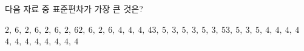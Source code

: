 다음 자료 중 표준편차가 가장 큰 것은?
\begin{choicesv}{$2,\ 6,\ 2,\ 6,\ 2,\ 6,\ 2,\ 6$}{$2,\ 6,\ 2,\ 6,\ 4,\ 4,\ 4,\ 4$}{$3,\ 5,\ 3,\ 5,\ 3,\ 5,\ 3,\ 5$}{$3,\ 5,\ 3,\ 5,\ 4,\ 4,\ 4,\ 4$}{$4,\ 4,\ 4,\ 4,\ 4,\ 4,\ 4,\ 4$}\end{choicesv}
